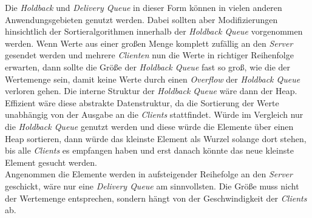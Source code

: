 Die \textit{Holdback} und \textit{Delivery Queue} in dieser Form können in vielen anderen Anwendungsgebieten genutzt werden. Dabei sollten aber Modifizierungen hinsichtlich der Sortieralgorithmen innerhalb der \textit{Holdback Queue} vorgenommen werden. Wenn Werte aus einer großen Menge komplett zufällig an den \textit{Server} gesendet werden und mehrere \textit{Clienten} nun die Werte in richtiger Reihenfolge erwarten, dann sollte die Größe der \textit{Holdback Queue} fast so groß, wie die der Wertemenge sein, damit keine Werte durch einen \textit{Overflow} der \textit{Holdback Queue} verloren gehen. Die interne Struktur der \textit{Holdback Queue} wäre dann der Heap. Effizient wäre diese abstrakte Datenstruktur, da die Sortierung der Werte unabhängig von der Ausgabe an die \textit{Clients} stattfindet. Würde im Vergleich nur die \textit{Holdback Queue} genutzt werden und diese würde die Elemente über einen Heap sortieren, dann würde das kleinste Element als Wurzel solange dort stehen, bis alle \textit{Clients} es empfangen haben und erst danach könnte das neue kleinste Element gesucht werden.\\
Angenommen die Elemente werden in aufsteigender Reihefolge an den \textit{Server} geschickt, wäre nur eine \textit{Delivery Queue} am sinnvollsten. Die Größe muss nicht der Wertemenge entsprechen, sondern hängt von der Geschwindigkeit der \textit{Clients} ab.